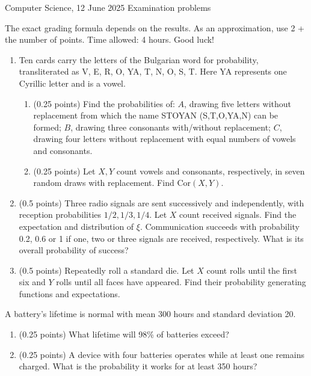 \documentclass[a4paper]{report}
\begin{document}
\noindent Computer Science, 12 June 2025 \hfill Examination problems
\hrulefill
\begin{it}The exact grading formula depends on the results. As an approximation, use 2 + the number of points. Time allowed: 4 hours. Good luck!\end{it}
\begin{problem}
\begin{enumerate}
\item Ten cards carry the letters of the Bulgarian word for probability, transliterated as V, E, R, O, YA, T, N, O, S, T. Here YA represents one Cyrillic letter and is a vowel.
\begin{enumerate}
\item (0.25 points) Find the probabilities of: $A$, drawing five letters without replacement from which the name STOYAN (S,T,O,YA,N) can be formed; $B$, drawing three consonants with/without replacement; $C$, drawing four letters without replacement with equal numbers of vowels and consonants.
\item (0.25 points) Let $X,Y$ count vowels and consonants, respectively, in seven random draws with replacement. Find $\mathrm{Cor}(X,Y)$.
\end{enumerate}
\item (0.5 points) Three radio signals are sent successively and independently, with reception probabilities $1/2,1/3,1/4$. Let $X$ count received signals. Find the expectation and distribution of $\xi$. Communication succeeds with probability 0.2, 0.6 or 1 if one, two or three signals are received, respectively. What is its overall probability of success?
\item (0.5 points) Repeatedly roll a standard die. Let $X$ count rolls until the first six and $Y$ rolls until all faces have appeared. Find their probability generating functions and expectations.
\end{enumerate}
\end{problem}
\begin{problem}
A battery's lifetime is normal with mean 300 hours and standard deviation 20.
\begin{enumerate}
\item (0.25 points) What lifetime will 98\% of batteries exceed?
\item (0.25 points) A device with four batteries operates while at least one remains charged. What is the probability it works for at least 350 hours?
\end{enumerate}
\end{problem}
\end{document}
